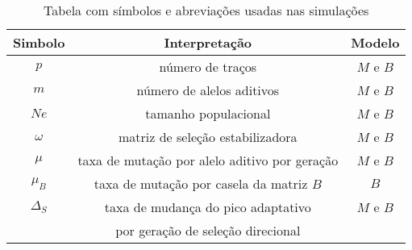 \begin{table}[htbp]
    \caption[Tabela de abreviações]{Tabela com símbolos e abreviações
    usadas nas simulações}
    \label{tab:exemplo}
    \vspace{1em}
    \centering
    \begin{tabular}{c c c}
        \toprule
        Simbolo    & Interpretação & Modelo\\
        \midrule
        $p$        & número de traços & $M$ e $B$\\
        $m$        & número de alelos aditivos & $M$ e $B$\\
        $Ne$       & tamanho populacional & $M$ e $B$   \\
        $\omega$   & matriz de seleção estabilizadora & $M$ e $B$\\
        $\mu$      & taxa de mutação por alelo aditivo por geração & $M$ e $B$\\
        $\mu_B$    & taxa de mutação por casela da matriz $B$ & $B$\\
        $\Delta_S$ & taxa de mudança do pico adaptativo & $M$ e $B$\\
                   & por geração de seleção direcional & \\

        \bottomrule
    \end{tabular}
\end{table}
